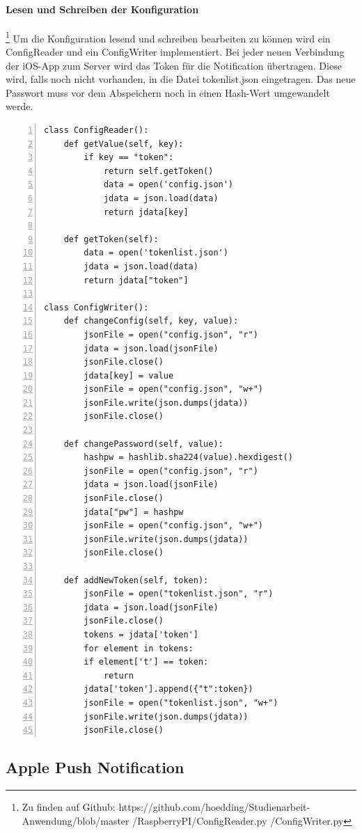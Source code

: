 \paragraph{Lesen und Schreiben der Konfiguration}\footnote{Zu finden auf Github: https://github.com/hoedding/Studienarbeit-Anwendung/blob/master /RaspberryPI/ConfigReader.py /ConfigWriter.py}  Um die Konfiguration lesend und schreiben bearbeiten zu können wird ein ConfigReader und ein ConfigWriter implementiert. Bei jeder neuen Verbindung der iOS-App zum Server wird das Token für die Notification übertragen. Diese wird, falls noch nicht vorhanden, in die Datei tokenlist.json eingetragen. Das neue Passwort muss vor dem Abspeichern noch in einen Hash-Wert umgewandelt werde. 
\begin{lstlisting}[caption=ConfigReader / ConfigWriter, language=xml, frame=single, breaklines=true,columns=fullflexible, commentstyle=\color{gray}\upshape, captionpos=b, numbers = left]
class ConfigReader():
	def getValue(self, key):
		if key == "token":
			return self.getToken()
			data = open('config.json')
			jdata = json.load(data)
			return jdata[key]

	def getToken(self):
		data = open('tokenlist.json')
		jdata = json.load(data)
		return jdata["token"]

class ConfigWriter():
	def changeConfig(self, key, value):
		jsonFile = open("config.json", "r")
		jdata = json.load(jsonFile)
		jsonFile.close()
		jdata[key] = value
		jsonFile = open("config.json", "w+")
		jsonFile.write(json.dumps(jdata))
		jsonFile.close()

	def changePassword(self, value):
		hashpw = hashlib.sha224(value).hexdigest()
		jsonFile = open("config.json", "r")
		jdata = json.load(jsonFile)
		jsonFile.close()
		jdata["pw"] = hashpw
		jsonFile = open("config.json", "w+")
		jsonFile.write(json.dumps(jdata))
		jsonFile.close()
		
	def addNewToken(self, token):
		jsonFile = open("tokenlist.json", "r")
		jdata = json.load(jsonFile)
		jsonFile.close()
		tokens = jdata['token']
		for element in tokens:
		if element['t'] == token:
			return
		jdata['token'].append({"t":token})
		jsonFile = open("tokenlist.json", "w+")
		jsonFile.write(json.dumps(jdata))
		jsonFile.close()
\end{lstlisting}

\subsection{Apple Push Notification} 
